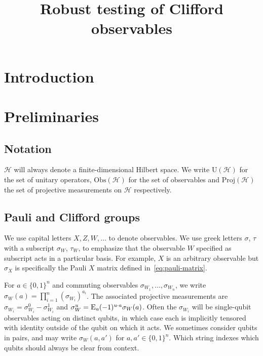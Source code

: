 \documentclass[11pt]{article}
\theoremstyle{remark}
\theoremstyle{definition}
\newcommand{\Es}[1]{\ensuremath{\mathop{\textsc{E}}_{#1}}}
\newcommand{\mH}{\mathcal{H}}
\newcommand{\setft}[1]{\mathrm{#1}}
\newcommand{\Proj}{\setft{Proj}}
\newcommand{\Obs}{\setft{Obs}}
\newcommand{\Unitary}{\setft{U}}
\begin{document}
\title{Robust testing of Clifford observables}
\author{}
\date{}
\maketitle

\noteswarning

\section{Introduction}
\label{sec:intro}


\section{Preliminaries}
\label{sec:prelim}


\subsection{Notation}
\label{sec:prelim-notation}

$\mH$ will always denote a finite-dimensional Hilbert space.  We write $\Unitary(\mH)$ for the set of unitary operators, $\Obs(\mH)$ for the set of observables and $\Proj(\mH)$ the set of projective measurements on $\mH$ respectively.  


\subsection{Pauli and Clifford groups}
\label{sec:groups}

We use capital letters $X,Z,W,\ldots$ to denote observables. We use greek letters $\sigma$, $\tau$ with a subscript $\sigma_W$, $\tau_W$, to emphasize that the observable $W$ specified as subscript acts in a particular basis. For example, $X$ is an arbitrary observable but $\sigma_X$ is specifically the Pauli $X$ matrix defined in~\eqref{eq:pauli-matrix}. 

For $a\in\{0,1\}^n$ and commuting observables $\sigma_{W_1},\ldots,\sigma_{W_n}$, we write $\sigma_W(a) = \prod_{i=1}^n (\sigma_{W_i})^{a_i}$. The associated projective measurements are $\sigma_{W_i} = \sigma_{W_i}^0 - \sigma_{W_i}^1$ and $\sigma_W^u = \Es{a} (-1)^{u\cdot a} \sigma_W(a)$.  Often the $\sigma_{W_i}$ will be single-qubit observables acting on distinct qubits, in which case each is implicitly tensored with identity outside of the qubit on which it acts. 
We sometimes consider qubits in pairs, and may write  $\sigma_W(a,a')$ for $a,a'\in\{0,1\}^n$. Which string indexes which qubits should always be clear from context. 
\end{document}
